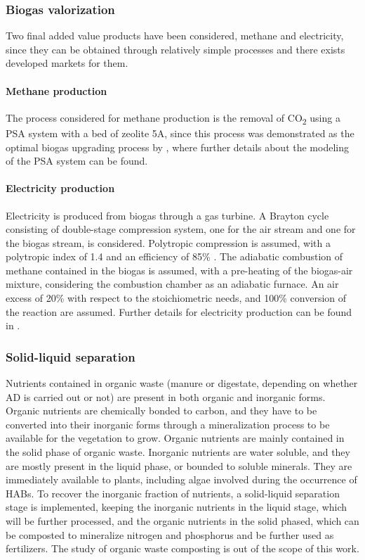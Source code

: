 \begin{refsection}[referencesCh4]
\subsubsection{Biogas valorization}
Two final added value products have been considered, methane and electricity, since they can be obtained through relatively simple processes and there exists developed markets for them.

\paragraph{Methane production}
The process considered for methane production is the removal of CO\textsubscript{2} using a PSA system with a bed of zeolite 5A, since this process was demonstrated as the optimal biogas upgrading process by \citet{MartinHernandez2020}, where further details about the modeling of the PSA system can be found.

\paragraph{Electricity production}
Electricity is produced from biogas through a gas turbine. A Brayton cycle consisting of double-stage compression system, one for the air stream and one for the biogas stream, is considered. Polytropic compression is assumed, with a polytropic index of 1.4 and an efficiency of 85\% \citep{moran2010fundamentals}. The adiabatic combustion of methane contained in the biogas is assumed, with a pre-heating of the biogas-air mixture, considering the combustion chamber as an adiabatic furnace. An air excess of 20\% with respect to the stoichiometric needs, and 100\% conversion of the reaction are assumed. Further details for electricity production can be found in \citet{MartinHernandez}.

\subsubsection{Solid-liquid separation}
Nutrients contained in organic waste (manure or digestate, depending on whether AD is carried out or not) are present in both organic and inorganic forms. Organic nutrients are chemically bonded to carbon, and they have to be converted into their inorganic forms through a mineralization process to be available for the vegetation to grow. Organic nutrients are mainly contained in the solid phase of organic waste. Inorganic nutrients are water soluble, and they are mostly present in the liquid phase, or bounded to soluble minerals. They are immediately available to plants, including algae involved during the occurrence of HABs. To recover the inorganic fraction of nutrients, a solid-liquid separation stage is implemented, keeping the inorganic nutrients in the liquid stage, which will be further processed, and the organic nutrients in the solid phased, which can be composted to mineralize nitrogen and phosphorus and be further used as fertilizers. The study of organic waste composting is out of the scope of this work.


\end{refsection}
